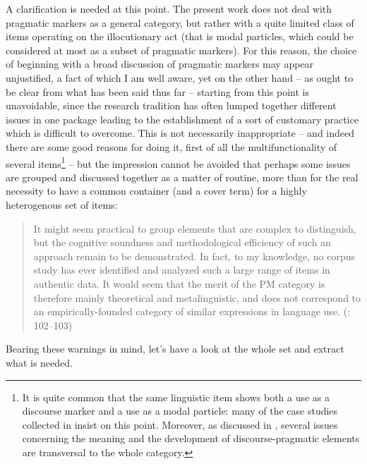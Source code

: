A clarification is needed at this point. The present work does not deal with pragmatic markers as a general category, but rather with a quite limited class of items operating on the illocutionary act (that is modal particles, which could be considered at most as a subset of pragmatic markers). For this reason, the choice of beginning with a broad discussion of pragmatic markers may appear unjustified, a fact of which I am well aware, yet on the other hand – as ought to be clear from what has been said thus far – starting from this point is unavoidable, since the research tradition has often lumped together different issues in one package leading to the establishment of a sort of customary practice which is difficult to overcome. This is not necessarily inappropriate – and indeed there are some good reasons for doing it, first of all the multifunctionality of several items\footnote{It is quite common that the same linguistic item shows both a use as a discourse marker and a use as a modal particle: many of the case studies collected in \citet{DegandEtAl2013} insist on this point. Moreover, as discussed in , several issues concerning the meaning and the development of discourse-pragmatic elements are transversal to the whole category.} – but the impression cannot be avoided that perhaps some issues are grouped and discussed together as a matter of routine, more than for the real necessity to have a common container (and a cover term) for a highly heterogenous set of items:

\begin{quote}
It might seem practical to group elements that are complex to distinguish, but the cognitive soundness and methodological efficiency of such an approach remain to be demonstrated. In fact, to my knowledge, no corpus study has ever identified and analyzed such a large range of items in authentic data. It would seem that the merit of the PM category is therefore mainly theoretical and metalinguistic, and does not correspond to an empirically-founded category of similar expressions in language use. (\citealt{Crible2017}: 102–103)
\end{quote}

Bearing these warnings in mind, let’s have a look at the whole set and extract what is needed.

